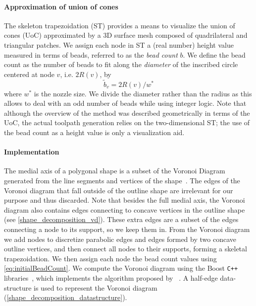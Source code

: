 \paragraph{Approximation of union of cones}
The skeleton trapezoidation (ST) provides a means to visualize the union of cones (UoC) approximated by a 3D surface mesh composed of quadrilateral and triangular patches.
We assign each node in ST a (real number) height value measured in terms of beads, referred to as the \emph{bead count} $b$.
We define the bead count as the number of beads to fit along the \emph{diameter} of the inscribed circle centered at node $v$, i.e. $2R(v)$, by
\begin{equation}
    \tilde{b}_v = 2 R(v) / w^*
\label{eq:initialBeadCount}
\end{equation}
where $w^*$ is the nozzle size. 
We divide the diameter rather than the radius as this allows to deal with an odd number of beads while using integer logic.
Note that although the overview of the method was described geometrically in terms of the UoC, the actual toolpath generation relies on the two-dimensional ST;
the use of the bead count as a height value is only a visualization aid.







\paragraph{Implementation}
The medial axis of a polygonal shape is a subset of the Voronoi Diagram generated from the line segments and vertices of the shape~\cite{lee1982medial}. 
The edges of the Voronoi diagram that fall outside of the outline shape are irrelevant for our purpose and thus discarded.
Note that besides the full medial axis, the Voronoi diagram also contains edges connecting to concave vertices in the outline shape (see \cref{shape_decomposition_vd}). 
These extra edges are a subset of the edges connecting a node to its support, so we keep them in.
From the Voronoi diagram we add nodes to discretize parabolic edges and edges formed by two concave outline vertices, and then connect all nodes to their supports, forming a skeletal trapezoidation. 
We then assign each node the bead count values using \cref{eq:initialBeadCount}.
We compute the Voronoi diagram using the Boost \verb!C++! libraries~\cite{schaling2011boost}, which implements the algorithm proposed by \citeauthor{fortune1986sascg}~\cite{fortune1986sascg}.
A half-edge data-structure is used to represent the Voronoi diagram (\cref{shape_decomposition_datastructure}).

